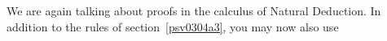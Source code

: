 %
\begin{isabellebody}%
\def\isabellecontext{a{\isadigit{4}}}%
\isamarkupfalse%
%
\isamarkuptrue%
%
\isamarkuptrue%
%
\begin{isamarkuptext}%
We are again talking about proofs in the calculus of Natural
Deduction. In addition to the rules of section~\ref{psv0304a3}, you may now also use


  ~\\
  ~\\
  ~\\
  ~\\


\end{isamarkuptext}
\end{isabellebody}
